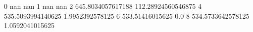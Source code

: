 0 nan nan
1 nan nan
2 645.8034057617188 112.28924560546875
4 535.5093994140625 1.9952392578125
6 533.51416015625 0.0
8 534.5733642578125 1.0592041015625
